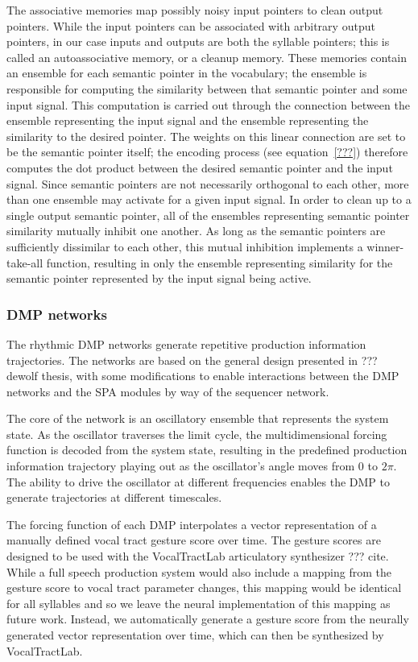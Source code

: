 The associative memories
map possibly noisy input pointers
to clean output pointers.
While the input pointers
can be associated with arbitrary
output pointers,
in our case inputs and outputs
are both the syllable pointers;
this is called an autoassociative memory,
or a cleanup memory.
These memories contain an ensemble
for each semantic pointer
in the vocabulary;
the ensemble is responsible for computing
the similarity between
that semantic pointer
and some input signal.
This computation is carried out
through the connection between
the ensemble representing the input signal
and the ensemble representing
the similarity to the desired pointer.
The weights on this linear connection
are set to be the semantic pointer itself;
the encoding process (see equation~\eqref{???})
therefore computes the dot product
between the desired semantic pointer
and the input signal.
Since semantic pointers are not necessarily
orthogonal to each other,
more than one ensemble may activate
for a given input signal.
In order to clean up to a single
output semantic pointer,
all of the ensembles
representing semantic pointer similarity
mutually inhibit one another.
As long as the semantic pointers
are sufficiently dissimilar
to each other,
this mutual inhibition
implements a winner-take-all function,
resulting in only the ensemble
representing similarity for the
semantic pointer represented by
the input signal being active.

\subsubsection{DMP networks}

The rhythmic DMP networks
generate repetitive
production information trajectories.
The networks are based on
the general design
presented in ??? dewolf thesis,
with some modifications
to enable interactions between
the DMP networks
and the SPA modules
by way of the sequencer network.

The core of the network
is an oscillatory ensemble
that represents the system state.
As the oscillator traverses
the limit cycle,
the multidimensional forcing function
is decoded from the system state,
resulting in the predefined
production information trajectory
playing out as
the oscillator's angle moves from $0$ to $2\pi$.
The ability to drive the oscillator
at different frequencies
enables the DMP to generate trajectories
at different timescales.

The forcing function of each DMP
interpolates a vector representation of
a manually defined
vocal tract gesture score over time.
The gesture scores are
designed to be used with the VocalTractLab
articulatory synthesizer ??? cite.
While a full speech production system
would also include a mapping from
the gesture score to
vocal tract parameter changes,
this mapping would be identical
for all syllables
and so we leave the neural implementation
of this mapping as future work.
Instead, we automatically generate
a gesture score from the neurally generated
vector representation over time,
which can then be synthesized
by VocalTractLab.

